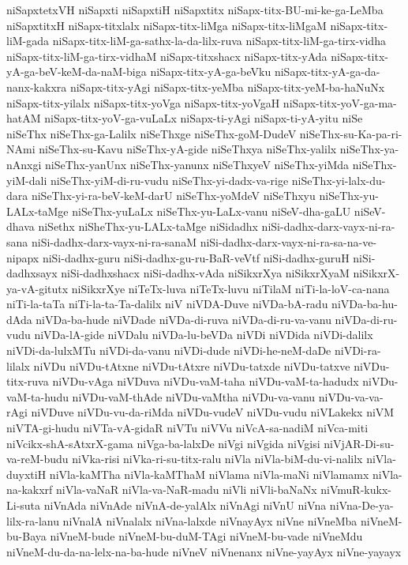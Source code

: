 {niSapxtetxVH
niSapxti
niSapxtiH
niSapxtitx
niSapx-titx-BU-mi-ke-ga-LeMba
niSapxtitxH
niSapx-titxlalx
niSapx-titx-liMga
niSapx-titx-liMgaM
niSapx-titx-liM-gada
niSapx-titx-liM-ga-sathx-la-da-lilx-ruva
niSapx-titx-liM-ga-tirx-vidha
niSapx-titx-liM-ga-tirx-vidhaM
niSapx-titxshacx
niSapx-titx-yAda
niSapx-titx-yA-ga-beV-keM-da-naM-biga
niSapx-titx-yA-ga-beVku
niSapx-titx-yA-ga-da-nanx-kakxra
niSapx-titx-yAgi
niSapx-titx-yeMba
niSapx-titx-yeM-ba-haNuNx
niSapx-titx-yilalx
niSapx-titx-yoVga
niSapx-titx-yoVgaH
niSapx-titx-yoV-ga-ma-hatAM
niSapx-titx-yoV-ga-vuLaLx
niSapx-ti-yAgi
niSapx-ti-yA-yitu
niSe
niSeThx
niSeThx-ga-Lalilx
niSeThxge
niSeThx-goM-DudeV
niSeThx-su-Ka-pa-ri-NAmi
niSeThx-su-Kavu
niSeThx-yA-gide
niSeThxya
niSeThx-yalilx
niSeThx-ya-nAnxgi
niSeThx-yanUnx
niSeThx-yanunx
niSeThxyeV
niSeThx-yiMda
niSeThx-yiM-dali
niSeThx-yiM-di-ru-vudu
niSeThx-yi-dadx-va-rige
niSeThx-yi-lalx-du-dara
niSeThx-yi-ra-beV-keM-darU
niSeThx-yoMdeV
niSeThxyu
niSeThx-yu-LALx-taMge
niSeThx-yuLaLx
niSeThx-yu-LaLx-vanu
niSeV-dha-gaLU
niSeV-dhava
niSethx
niSheThx-yu-LALx-taMge
niSidadhx
niSi-dadhx-darx-vayx-ni-ra-sana
niSi-dadhx-darx-vayx-ni-ra-sanaM
niSi-dadhx-darx-vayx-ni-ra-sa-na-ve-nipapx
niSi-dadhx-guru
niSi-dadhx-gu-ru-BaR-veVtf
niSi-dadhx-guruH
niSi-dadhxsayx
niSi-dadhxshacx
niSi-dadhx-vAda
niSikxrXya
niSikxrXyaM
niSikxrX-ya-vA-gitutx
niSikxrXye
niTeTx-luva
niTeTx-luvu
niTilaM
niTi-la-loV-ca-nana
niTi-la-taTa
niTi-la-ta-Ta-dalilx
niV
niVDA-Duve
niVDa-bA-radu
niVDa-ba-hu-dAda
niVDa-ba-hude
niVDade
niVDa-di-ruva
niVDa-di-ru-va-vanu
niVDa-di-ru-vudu
niVDa-lA-gide
niVDalu
niVDa-lu-beVDa
niVDi
niVDida
niVDi-dalilx
niVDi-da-lulxMTu
niVDi-da-vanu
niVDi-dude
niVDi-he-neM-daDe
niVDi-ra-lilalx
niVDu
niVDu-tAtxne
niVDu-tAtxre
niVDu-tatxde
niVDu-tatxve
niVDu-titx-ruva
niVDu-vAga
niVDuva
niVDu-vaM-taha
niVDu-vaM-ta-hadudx
niVDu-vaM-ta-hudu
niVDu-vaM-thAde
niVDu-vaMtha
niVDu-va-vanu
niVDu-va-va-rAgi
niVDuve
niVDu-vu-da-riMda
niVDu-vudeV
niVDu-vudu
niVLakekx
niVM
niVTA-gi-hudu
niVTa-vA-gidaR
niVTu
niVVu
niVcA-sa-nadiM
niVca-miti
niVcikx-shA-sAtxrX-gama
niVga-ba-lalxDe
niVgi
niVgida
niVgisi
niVjAR-Di-su-va-reM-budu
niVka-risi
niVka-ri-su-titx-ralu
niVla
niVla-biM-du-vi-nalilx
niVla-duyxtiH
niVla-kaMTha
niVla-kaMThaM
niVlama
niVla-maNi
niVlamamx
niVla-na-kakxrf
niVla-vaNaR
niVla-va-NaR-madu
niVli
niVli-baNaNx
niVmuR-kukx-Li-suta
niVnAda
niVnAde
niVnA-de-yalAlx
niVnAgi
niVnU
niVna
niVna-De-ya-lilx-ra-lanu
niVnalA
niVnalalx
niVna-lalxde
niVnayAyx
niVne
niVneMba
niVneM-bu-Baya
niVneM-bude
niVneM-bu-duM-TAgi
niVneM-bu-vade
niVneMdu
niVneM-du-da-na-lelx-na-ba-hude
niVneV
niVnenanx
niVne-yayAyx
niVne-yayayx
}
